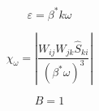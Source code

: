 {\newpage\clearpage
{}%
\begin{displaymath}
\varepsilon = \beta^* k \omega
\end{displaymath}%
\lthtmldisplayZ
\lthtmlcheckvsize\clearpage}

{\newpage\clearpage
{}%
\begin{displaymath}
\chi_{\omega} = \left| \frac{W_{ij} W_{jk} \hat S_{ki}}
  {(\beta^* \omega)^3} \right|
\end{displaymath}%
\lthtmldisplayZ
\lthtmlcheckvsize\clearpage}

{\newpage\clearpage
{}%
\begin{displaymath}
B=1
\end{displaymath}%
\lthtmldisplayZ
\lthtmlcheckvsize\clearpage}



